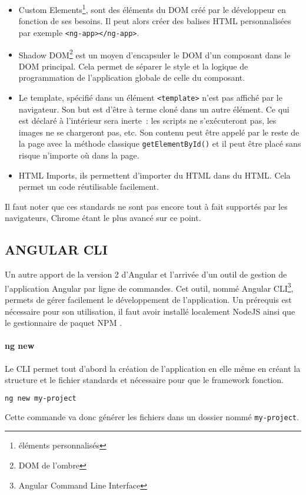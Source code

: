 \begin{itemize}
	\item Custom Elements\footnote{éléments personnalisés}, sont des éléments du DOM créé par le développeur en fonction de ses besoins. Il peut alors créer des balises HTML personnalisées par exemple \texttt{<ng-app></ng-app>}.
	\item Shadow DOM\footnote{DOM de l'ombre} est un moyen d'encapsuler le DOM d'un composant dans le DOM principal. Cela permet de séparer le style et la logique de programmation de l'application globale de celle du composant.
	\item Le template, spécifié dans un élément \texttt{<template>} n’est pas affiché par le navigateur. Son but est d’être à terme cloné dans un autre élément. Ce qui est déclaré à l’intérieur sera inerte : les scripts ne s’exécuteront pas, les images ne se chargeront pas, etc. Son contenu peut être appelé par le reste de la page avec la méthode classique \texttt{getElementById()} et il peut être placé sans risque n’importe où dans la page.
	\item HTML Imports, ils permettent d'importer du HTML dans du HTML. Cela permet un code réutilisable facilement.
\end{itemize}
Il faut noter que ces standards ne sont pas encore tout à fait supportés par les navigateurs, Chrome étant le plus avancé sur ce point.

\subsection{ANGULAR CLI}
Un autre apport de la version 2 d'Angular et l'arrivée d'un outil de gestion de l'application Angular par ligne de commandes. Cet outil, nommé Angular CLI\footnote{Angular Command Line Interface}, permets de gérer facilement le développement de l'application. Un prérequis est nécessaire pour son utilisation, il faut avoir installé localement NodeJS ainsi que le gestionnaire de paquet NPM \cite{angluar:cli}.
\paragraph{ng new}
Le CLI permet tout d'abord la création de l'application en elle même en créant la structure et le fichier standards et nécessaire pour que le framework fonction.
\begin{lstlisting}[language=bash]
ng new my-project
\end{lstlisting}
Cette commande va donc générer les fichiers dans un dossier nommé \texttt{my-project}.

